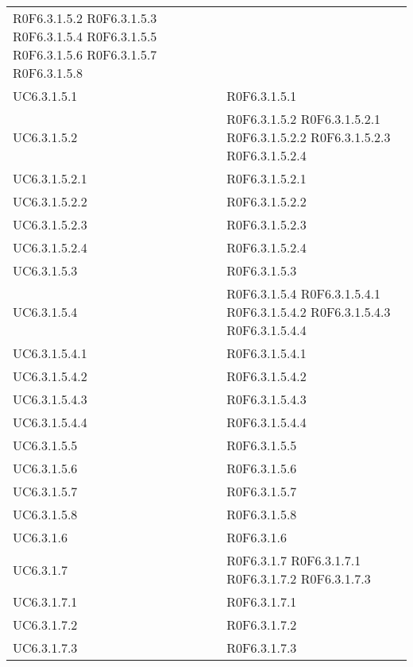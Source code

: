 \begin{longtable}{p{2.5cm}!{\VRule[1pt]}p{2.5cm}}
	\newline R0F6.3.1.5.2
	\newline R0F6.3.1.5.3
	\newline R0F6.3.1.5.4
	\newline R0F6.3.1.5.5
	\newline R0F6.3.1.5.6
	\newline R0F6.3.1.5.7
	\newline R0F6.3.1.5.8\\
UC6.3.1.5.1 & R0F6.3.1.5.1\\
UC6.3.1.5.2 & R0F6.3.1.5.2
	\newline R0F6.3.1.5.2.1
	\newline R0F6.3.1.5.2.2
	\newline R0F6.3.1.5.2.3
	\newline R0F6.3.1.5.2.4\\
UC6.3.1.5.2.1 & R0F6.3.1.5.2.1\\
UC6.3.1.5.2.2 & R0F6.3.1.5.2.2\\
UC6.3.1.5.2.3 & R0F6.3.1.5.2.3\\
UC6.3.1.5.2.4 & R0F6.3.1.5.2.4\\
UC6.3.1.5.3 & R0F6.3.1.5.3\\
UC6.3.1.5.4 & R0F6.3.1.5.4
	\newline R0F6.3.1.5.4.1
	\newline R0F6.3.1.5.4.2
	\newline R0F6.3.1.5.4.3
	\newline R0F6.3.1.5.4.4\\
UC6.3.1.5.4.1 & R0F6.3.1.5.4.1\\
UC6.3.1.5.4.2 & R0F6.3.1.5.4.2\\
UC6.3.1.5.4.3 & R0F6.3.1.5.4.3\\
UC6.3.1.5.4.4 & R0F6.3.1.5.4.4\\
UC6.3.1.5.5 & R0F6.3.1.5.5\\
UC6.3.1.5.6 & R0F6.3.1.5.6\\
UC6.3.1.5.7 & R0F6.3.1.5.7\\
UC6.3.1.5.8 & R0F6.3.1.5.8\\
UC6.3.1.6 & R0F6.3.1.6\\
UC6.3.1.7 & R0F6.3.1.7
	\newline R0F6.3.1.7.1
	\newline R0F6.3.1.7.2
	\newline R0F6.3.1.7.3\\
UC6.3.1.7.1 & R0F6.3.1.7.1\\
UC6.3.1.7.2 & R0F6.3.1.7.2\\
UC6.3.1.7.3 & R0F6.3.1.7.3\\

\end{longtable}
